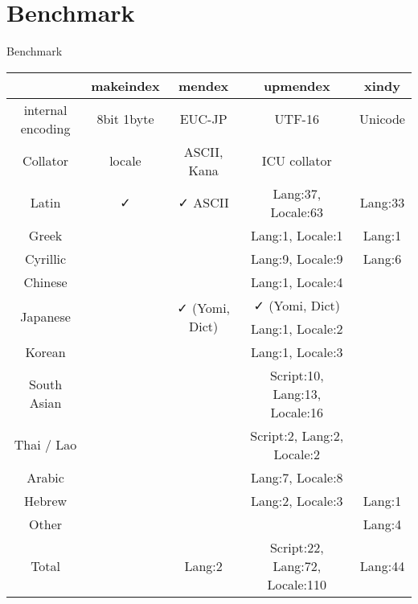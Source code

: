 \documentclass[aspectratio=169,10pt]{beamer}
\begin{document}

\section{Benchmark}
\begin{frame}{Benchmark}

\begin{center}
\footnotesize
\begin{tabular}{c|c|c|c|c}
            & makeindex & mendex      & upmendex            & xindy   \\\hline\hline
internal encoding & 8bit 1byte & EUC-JP    & UTF-16         & Unicode \\
Collator    & locale    & ASCII, Kana & ICU collator        &         \\\hline
Latin       & ✓        & ✓ ASCII    & Lang:37, Locale:63  & Lang:33 \\
Greek       &           &             & Lang:1, Locale:1    & Lang:1 \\
Cyrillic    &           &             & Lang:9, Locale:9    & Lang:6 \\\hdashline
Chinese     &           &             & Lang:1, Locale:4    &  \\
\multirow{2}{*}{Japanese} & & \multirow{2}{*}{✓ (Yomi, Dict)} & ✓ (Yomi, Dict) & \\
            &           &             & Lang:1, Locale:2    & \\
Korean      &           &             & Lang:1, Locale:3    & \\\hdashline
South Asian &           &   & Script:10, Lang:13, Locale:16 & \\
Thai / Lao  &           &   & Script:2, Lang:2, Locale:2    & \\
Arabic      &           &             & Lang:7, Locale:8    & \\
Hebrew      &           &             & Lang:2, Locale:3    & Lang:1  \\\hdashline
Other       &           &             &                     & Lang:4  \\\hline
Total       &           & Lang:2      & Script:22, Lang:72, Locale:110  & Lang:44 \\
\end{tabular}
\end{center}

\end{frame}

\end{document}

